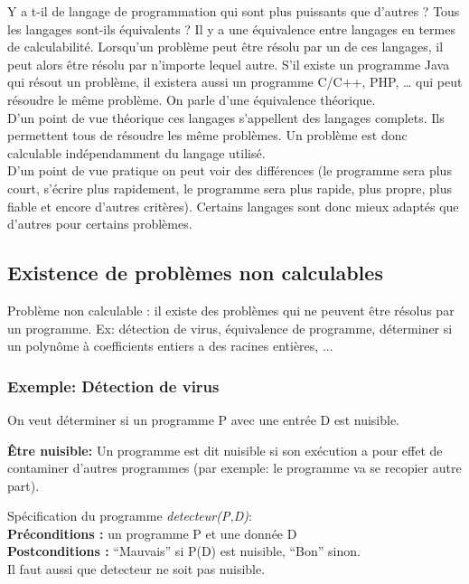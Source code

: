 Y a t-il de langage de programmation qui sont plus puissants que d'autres ? Tous les langages sont-ils équivalents ? 
\newline 
Il y a une équivalence entre langages en termes de calculabilité.  Lorsqu'un problème peut être résolu par un de ces langages, il peut alors être résolu par n'importe lequel autre.   
S'il existe un programme Java qui résout un problème, il existera aussi un programme C/C++, PHP, … qui peut résoudre le même problème. On parle d'une équivalence théorique.\\
D'un point de vue théorique ces langages s'appellent des langages complets. Ils permettent tous de résoudre les même problèmes.  Un problème est donc calculable indépendamment du langage utilisé. \\
D'un point de vue pratique on peut voir des différences (le programme sera plus court, s'écrire plus rapidement, le programme sera plus rapide, plus propre, plus fiable et encore d'autres critères).  Certains langages sont donc mieux adaptés que d'autres pour certains problèmes. 


\subsection{Existence de problèmes non calculables}
\label{subsec:existence_de_problemes_non_calculables}
	Problème non calculable : il existe des problèmes qui ne peuvent
		être résolus par un programme. Ex:
        détection de virus,
        équivalence de programme,
        déterminer si un polynôme à coefficients entiers a des racines entières, ...
	

\subsubsection{Exemple: Détection de virus}
\label{subsubsec:detection_de_virus}
On veut déterminer si un programme P avec une entrée D est nuisible.

\textbf{Être nuisible:} Un programme est dit nuisible si son exécution a pour effet de contaminer d'autres programmes (par exemple: le programme va se recopier autre part). 

Spécification du programme \textit{detecteur(P,D)}:\\
\textbf{Préconditions :} un programme P et une donnée D\\
\textbf{Postconditions :} ``Mauvais'' si P(D) est nuisible,
		``Bon'' sinon.\\
Il faut aussi que detecteur ne soit pas nuisible.

